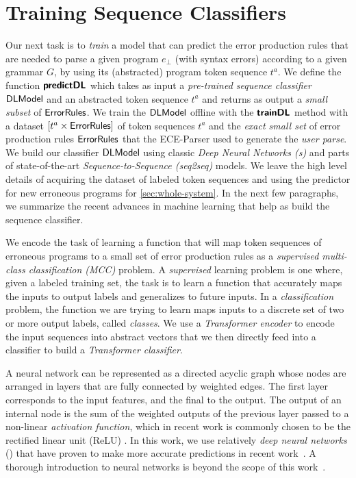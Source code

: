 \section{Training Sequence Classifiers}
\label{sec:seq-classifiers}

Our next task is to \emph{train} a model that can predict the error production
rules that are needed to parse a given program $e_{\bot}$ (with syntax errors)
according to a given grammar $G$, by using its (abstracted) program token
sequence $t^a$.
%
We define the function $\bm{\mathsf{predictDL}}$ which takes as input a \emph{pre-trained
sequence classifier} $\mathsf{DLModel}$ and an abstracted token sequence $t^a$ and returns
as output a \emph{small subset} of $\mathsf{ErrorRules}$.
%
We train the $\mathsf{DLModel}$ offline with the $\bm{\mathsf{trainDL}}$ method with a dataset
$[t^a \times \mathsf{ErrorRules}]$ of token sequences $t^a$ and the \emph{exact
small set} of error production rules $\mathsf{ErrorRules}$ that the ECE-Parser used
to generate the \emph{user parse}. We build our classifier $\mathsf{DLModel}$ using
classic \emph{Deep Neural Networks (\dnn{}s)} and parts of state-of-the-art
\emph{Sequence-to-Sequence (seq2seq)} models. We leave the high level details of
acquiring the dataset of labeled token sequences and using the predictor for new
erroneous programs for \autoref{sec:whole-system}. In the next few paragraphs,
we summarize the recent advances in machine learning that help as build the
sequence classifier.

We encode the task of learning a function that will map token sequences of
erroneous programs to a small set of error production rules as a
\emph{supervised multi-class classification (MCC)} problem. A \emph{supervised}
learning problem is one where, given a labeled training set, the task is to
learn a function that accurately maps the inputs to output labels and
generalizes to future inputs. In a \emph{classification} problem, the function
we are trying to learn maps inputs to a discrete set of two or more output
labels, called \emph{classes}. We use a \emph{Transformer encoder} to encode the
input sequences into abstract vectors that we then directly feed into a
\emph{\dnn} classifier to build a \emph{Transformer classifier}.

A neural network can be represented as a directed acyclic graph whose nodes are
arranged in layers that are fully connected by weighted edges. The first layer
corresponds to the input features, and the final to the output. The output of an
internal node is the sum of the weighted outputs of the previous layer passed to
a non-linear \emph{activation function}, which in recent work is commonly chosen
to be the rectified linear unit (ReLU) \citep{Nair2010-xg}. In this work, we use
relatively \emph{deep neural networks} (\dnn) that have proven to make more
accurate predictions in recent work~\citep{Schmidhuber_2015}. A thorough
introduction to neural networks is beyond the scope of this
work~\citep{Hastie2009-bn, Nielsen2015-pu}.

